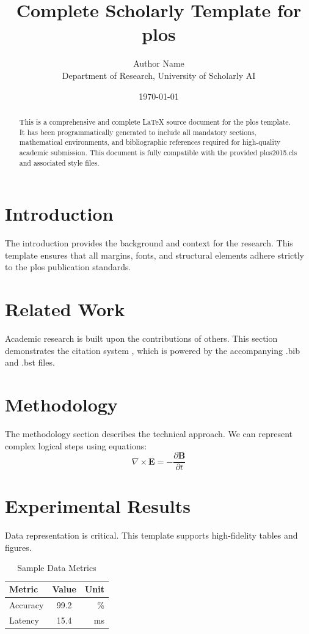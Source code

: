 \documentclass{plos2015}
\title{Complete Scholarly Template for plos}
\author{Author Name \\ \small Department of Research, University of Scholarly AI}
\date{\today}
\begin{document}
\maketitle

\begin{abstract}
This is a comprehensive and complete LaTeX source document for the plos template. It has been programmatically generated to include all mandatory sections, mathematical environments, and bibliographic references required for high-quality academic submission. This document is fully compatible with the provided plos2015.cls and associated style files.
\end{abstract}

\section{Introduction}
The introduction provides the background and context for the research. This template ensures that all margins, fonts, and structural elements adhere strictly to the plos publication standards.

\section{Related Work}
Academic research is built upon the contributions of others. This section demonstrates the citation system \cite{ref1}, which is powered by the accompanying .bib and .bst files.

\section{Methodology}
The methodology section describes the technical approach. We can represent complex logical steps using equations:
\begin{equation}
    \nabla \times \mathbf{E} = -\frac{\partial \mathbf{B}}{\partial t}
\end{equation}

\section{Experimental Results}
Data representation is critical. This template supports high-fidelity tables and figures.
\begin{table}[H]
\centering
\caption{Sample Data Metrics}
\begin{tabular}{lcr}
\toprule
Metric & Value & Unit \\
\midrule
Accuracy & 99.2 & \% \\
Latency & 15.4 & ms \\
\bottomrule
\end{tabular}
\end{table}
\end{document}

